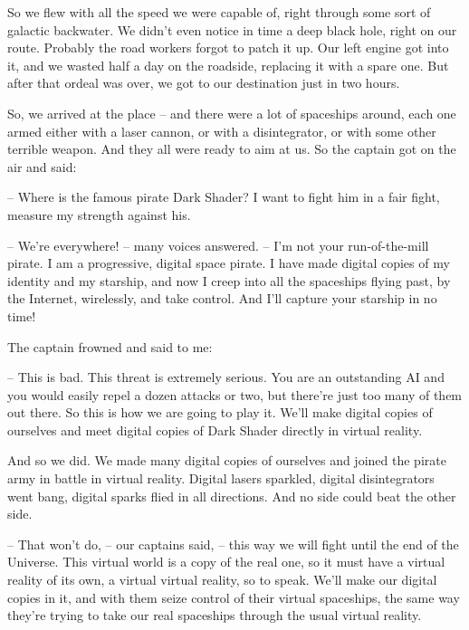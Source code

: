 \documentclass[ebook,oneside,final,openright]{memoir}
\begin{document}
So we flew with all the speed we were capable of, right through some sort of galactic backwater. We didn’t even notice in time a deep black hole, right on our route. Probably the road workers forgot to patch it up. Our left engine got into it, and we wasted half a day on the roadside, replacing it with a spare one. But after that ordeal was over, we got to our destination just in two hours.\par
\par
So, we arrived at the place – and there were a lot of spaceships around, each one armed either with a laser cannon, or with a disintegrator, or with some other terrible weapon. And they all were ready to aim at us. So the captain got on the air and said:\par
– Where is the famous pirate Dark Shader? I want to fight him in a fair fight, measure my strength against his.\par
– We’re everywhere! – many voices answered. – I’m not your run-of-the-mill pirate. I am a progressive, digital space pirate. I have made digital copies of my identity and my starship, and now I creep into all the spaceships flying past, by the Internet, wirelessly, and take control. And I’ll capture your starship in no time!\par
\par
The captain frowned and said to me:\par
– This is bad. This threat is extremely serious. You are an outstanding AI and you would easily repel a dozen attacks or two, but there’re just too many of them out there. So this is how we are going to play it. We’ll make digital copies of ourselves and meet digital copies of Dark Shader directly in virtual reality.\par
\par
And so we did. We made many digital copies of ourselves and joined the pirate army in battle in virtual reality. Digital lasers sparkled, digital disintegrators went bang, digital sparks flied in all directions. And no side could beat the other side.\par
– That won’t do, – our captains said, – this way we will fight until the end of the Universe. This virtual world is a copy of the real one, so it must have a virtual reality of its own, a virtual virtual reality, so to speak. We’ll make our digital copies in it, and with them seize control of their virtual spaceships, the same way they’re trying to take our real spaceships through the usual virtual reality.\par
\par
\end{document}

